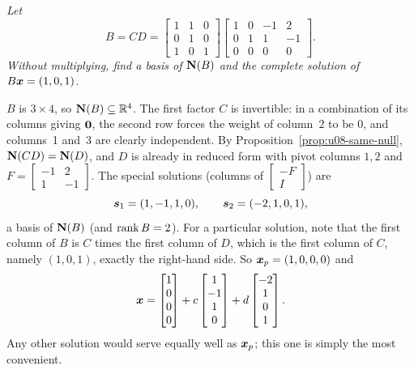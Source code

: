 \begin{example}\label{ex:u14-CD}
\emph{Let}
\[
B=CD=\begin{bmatrix}1&1&0\\0&1&0\\1&0&1\end{bmatrix}\begin{bmatrix}1&0&-1&2\\0&1&1&-1\\0&0&0&0\end{bmatrix}.
\]
\emph{Without multiplying, find a basis of $\mathbf{N}(B)$ and the complete solution of
$B\boldsymbol{x}=(1,0,1)$.}

$B$ is $3\times4$, so $\mathbf{N}(B)\subseteq\mathbb{R}^4$. The first factor $C$ is invertible: in a combination of
its columns giving $\boldsymbol{0}$, the second row forces the weight of column~2 to be $0$, and columns~1
and~3 are clearly independent. By Proposition~\ref{prop:u08-same-null}, $\mathbf{N}(CD)=\mathbf{N}(D)$, and $D$ is
already in reduced form with pivot columns $1,2$ and $F=\begin{bmatrix}-1&2\\1&-1\end{bmatrix}$.
The special solutions (columns of $\begin{bmatrix}-F\\I\end{bmatrix}$) are
\[
\boldsymbol{s}_1=(1,-1,1,0),\qquad\boldsymbol{s}_2=(-2,1,0,1),
\]
a basis of $\mathbf{N}(B)$ (and $\operatorname{rank} B=2$). For a particular solution, note that the first column of $B$
is $C$ times the first column of $D$, which is the first column of $C$, namely $(1,0,1)$, exactly the
right-hand side. So $\boldsymbol{x}_p=(1,0,0,0)$ and
\[
\boldsymbol{x}=\begin{bmatrix}1\\0\\0\\0\end{bmatrix}+c\begin{bmatrix}1\\-1\\1\\0\end{bmatrix}
+d\begin{bmatrix}-2\\1\\0\\1\end{bmatrix}.
\]
Any other solution would serve equally well as $\boldsymbol{x}_p$; this one is simply the most convenient.
\end{example}

